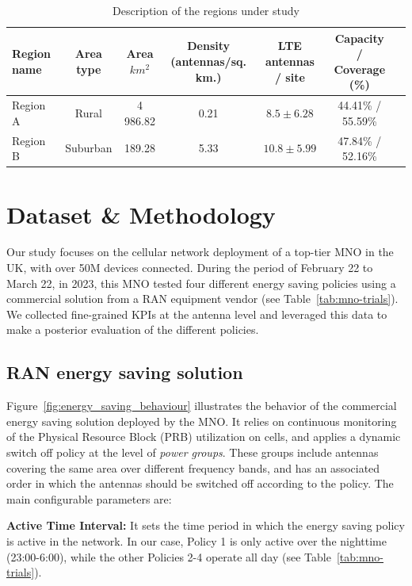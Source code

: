 \begin{table}[!t]
\caption{Description of the regions under study}
\label{tab:regions}
\centering
\begin{tabular}{lcccccc}
\toprule
\textbf{Region name} & \textbf{Area type} & \textbf{Area $km^2$} & \textbf{Density (antennas/sq. km.)} & \textbf{LTE antennas / site} & \textbf{Capacity / Coverage (\%)}\\

\midrule
Region A & Rural & 4 986.82 & 0.21 & $8.5 \pm 6.28$ & 44.41\% / 55.59\% \\
Region B & Suburban & 189.28 & 5.33 & $10.8 \pm 5.99$ & 47.84\% / 52.16\% \\
\bottomrule
\end{tabular}
\end{table}

\section{Dataset \& Methodology}
Our study focuses on the cellular network deployment of a top-tier MNO in the UK, with over 50M devices connected. During the period of February 22 to March 22, in 2023, this MNO tested four different energy saving policies using a commercial solution from a RAN equipment vendor (see Table~\ref{tab:mno-trials}). We collected fine-grained KPIs at the antenna level and leveraged this data to make a posterior evaluation of the different policies.

\subsection{RAN energy saving solution}\label{subsec:background-energy-saving}

Figure~\ref{fig:energy_saving_behaviour} illustrates the behavior of the commercial energy saving solution deployed by the MNO. It relies on continuous monitoring of the Physical Resource Block (PRB) utilization on cells, and applies a dynamic switch off policy at the level of \textit{power groups}. These groups include antennas covering the same area over different frequency bands, and has an associated order in which the antennas should be switched off according to the policy. The main configurable parameters are:

\textbf{Active Time Interval:} It sets the time period in which the energy saving policy is active in the network. In our case, Policy 1 is only active over the nighttime (23:00-6:00), while the other Policies 2-4 operate all day (see Table~\ref{tab:mno-trials}).

